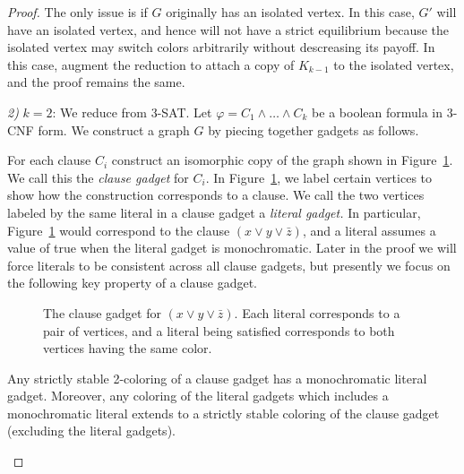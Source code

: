 \documentclass{llncs}
\begin{document}
\begin{proof}
The only issue is if $G$ originally has an isolated vertex. In this case, $G'$
will have an isolated vertex, and hence will not have a strict equilibrium
because the isolated vertex may switch colors arbitrarily without descreasing
its payoff.  In this case, augment the reduction to attach a copy of $K_{k-1}$
to the isolated vertex, and the proof remains the same.

\noindent \emph{2)} $k =2$:
We reduce from 3-SAT. Let $\varphi
= C_1 \wedge \dots \wedge C_k$ be a boolean formula in 3-CNF form. We construct
a graph $G$ by piecing together gadgets as follows.

For each clause $C_i$ construct an isomorphic copy of the graph shown in
Figure~\ref{fig:clausegadget}. We call this the \emph{clause gadget} for $C_i$.
In Figure~\ref{fig:clausegadget}, we label certain vertices to show how the
construction corresponds to a clause.  We call the two vertices labeled by the
same literal in a clause gadget a \emph{literal gadget.} In particular,
Figure~\ref{fig:clausegadget} would correspond to the clause $(x \vee y \vee
\bar{z})$, and a literal assumes a value of true when the literal gadget is
monochromatic. Later in the proof we will force literals to be consistent
across all clause gadgets, but presently we focus on the following key property
of a clause gadget.

\begin{figure}[t]
\centering
{}
\caption{The clause gadget for $(x \vee y \vee \bar{z})$. Each literal
corresponds to a pair of vertices, and a literal being satisfied corresponds
to both vertices having the same color.}
\label{fig:clausegadget}
\end{figure}

\begin{lemma}
\label{lemma:clausegadget}
Any strictly stable 2-coloring of a clause gadget has a monochromatic literal
gadget. Moreover, any coloring of the literal gadgets which includes a
monochromatic literal extends to a strictly stable coloring of the clause
gadget (excluding the literal gadgets).
\end{lemma}


\end{proof}
\end{document}
